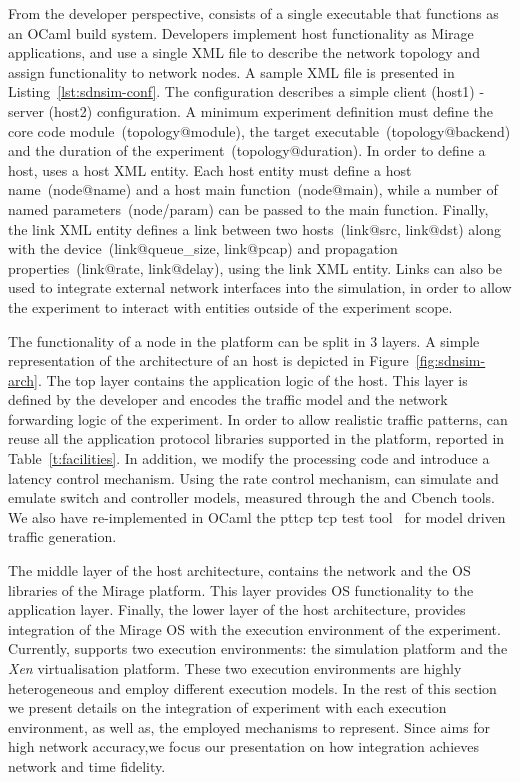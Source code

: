 From the developer perspective, \sdnsim consists of a single executable that
functions as an OCaml build system. Developers implement host functionality as
Mirage applications, and use a single XML file to describe the network topology
and assign functionality to network nodes.  A sample XML file is presented in
Listing~\ref{lst:sdnsim-conf}. The configuration describes a simple client
(host1) - server (host2) configuration.  A minimum experiment definition must
define the core code module~(topology@module), the target
executable~(topology@backend) and the duration of the
experiment~(topology@duration). In order to define a host, \sdnsim uses a host
XML entity. Each host entity must define a host name~(node@name) and a host main
function~(node@main), while a number of named parameters~(node/param) can be
passed to the main function. Finally, the link XML entity defines a link between
two hosts~(link@src, link@dst) along with the device~(link@queue\_size,
link@pcap) and propagation properties~(link@rate, link@delay), using the link
XML entity. Links can also be used to integrate external network interfaces into
the simulation, in order to allow the experiment to interact with entities
outside of the experiment scope.

The functionality of a node in the \sdnsim platform can be split in 3 layers.  A
simple representation of the architecture of an \sdnsim host is depicted in
Figure~\ref{fig:sdnsim-arch}.  The top layer contains the application logic of
the host. This layer is defined by the developer and encodes the traffic model
and the network forwarding logic of the experiment. In order to allow realistic
traffic patterns, \sdnsim can reuse all the application protocol libraries
supported in the \mirage platform, reported in Table~\ref{t:facilities}. In addition,
we modify the \of processing code and introduce a latency control mechanism. 
Using the rate control mechanism, \sdnsim can simulate and emulate
switch and controller models, measured through the \oflops and Cbench tools.
We also have re-implemented in OCaml the pttcp tcp test tool~\cite{pttcp} for
model driven traffic generation. 

The middle layer of the host architecture, contains the network and the OS
libraries of the Mirage platform. This layer provides OS functionality to the
application layer. Finally, the lower layer of the host architecture, provides
integration of the Mirage OS with the execution environment of the experiment.
Currently, \sdnsim supports two execution environments: the {\it {}}
\/simulation platform  and the {\it Xen} \/virtualisation platform. These two
execution environments are highly heterogeneous and employ different execution
models.  In the rest of this section we present details on the integration of
\sdnsim experiment with each execution environment, as well as, the employed
mechanisms to represent.  Since \sdnsim aims for
high network accuracy,we focus our presentation on how integration achieves 
network and time fidelity.

